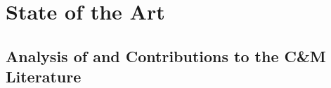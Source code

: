 \chapter{State of the Art}
\label{cha:state_of_the_art}


\section{Analysis of and Contributions to the C\&M Literature}






